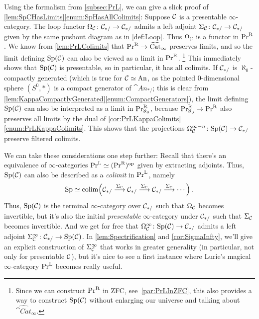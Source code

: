 \begin{rem}\label{rem:SpPresentable}
	Using the formalism from \cref{subsec:PrL}, we can give a slick proof of \cref{lem:SpCHasLimits}\cref{enum:SpHasAllColimits}: Suppose $\mathcal{C}$ is a presentable $\infty$-category. The loop functor $\Omega_{\mathcal{C}}\colon \mathcal{C}_{*/}\rightarrow \mathcal{C}_{*/}$ admits a left adjoint $\Sigma_{\mathcal{C}}\colon \mathcal{C}_{*/}\rightarrow \mathcal{C}_{*/}$ given by the same pushout diagram as in \cref{def:Loop}. Thus $\Omega_{\mathcal{C}}$ is a functor in $\mathrm{Pr}^{\mathrm{R}}$. We know from \cref{lem:PrLColimits} that $\mathrm{Pr}^{\mathrm{R}}\rightarrow \widehat{\mathrm{Cat}}_\infty$ preserves limits, and so the limit defining $\mathrm{Sp}(\mathcal{C})$ can also be viewed as a limit in $\mathrm{Pr}^{\mathrm{R}}$.%
	\footnote{Since we can construct $\mathrm{Pr}^{\mathrm{R}}$ in ZFC, see~\cref{par:PrLInZFC}, this also provides a way to construct $\mathrm{Sp}(\mathcal{C})$ without enlarging our universe and talking about $\widehat{\cat{Cat}}_\infty$.}
	This immediately shows that $\mathrm{Sp}(\mathcal{C})$ is presentable, so in particular, it has all colimits. If $\mathcal{C}_{*/}$ is $\aleph_0$-compactly generated (which is true for $\mathcal{C}\simeq \mathrm{An}$, as  the pointed $0$-dimensional sphere $(S^0,*)$ is a compact generator of $\cat{An}_{*/}$; this is clear from \cref{lem:KappaCompactlyGenerated}\cref{enum:CompactGenerators}), the limit defining $\mathrm{Sp}(\mathcal{C})$ can also be interpreted as a limit in $\mathrm{Pr}_{\aleph_0}^{\mathrm{R}}$, because $\mathrm{Pr}_{\aleph_0}^{\mathrm{R}}\rightarrow \mathrm{Pr}^{\mathrm{R}}$ also preserves all limits by the dual of \cref{cor:PrLKappaColimits}\cref{enum:PrLKappaColimits}. This shows that the projections $\Omega_{\mathcal{C}}^{\infty-n}\colon \mathrm{Sp}(\mathcal{C})\rightarrow \mathcal{C}_{*/}$ preserve filtered colimits.
	
	We can take these considerations one step further: Recall that there's an equivalence of $\infty$-categories $\mathrm{Pr}^{\mathrm{L}}\simeq (\mathrm{Pr}^{\mathrm{R}})^{\mathrm{op}}$ given by extracting adjoints. Thus, $\mathrm{Sp}(\mathcal{C})$ can also be described as a \emph{colimit} in $\mathrm{Pr}^{\mathrm{L}}$, namely
	\begin{equation*}
		 \cat{Sp}\simeq \colimit\left(\Cc_{*/}\overset{\Sigma_\Cc}{\longrightarrow}\Cc_{*/}\overset{\Sigma_\Cc}{\longrightarrow}\Cc_{*/}\overset{\Sigma_\Cc}{\longrightarrow}\dotsb\right)\,.
	\end{equation*}
	Thus, $\mathrm{Sp}(\mathcal{C})$ is the terminal $\infty$-category over $\mathcal{C}_{*/}$ such that $\Omega_{\mathcal{C}}$ becomes invertible, but it's also the initial \emph{presentable} $\infty$-category under $\mathcal{C}_{*/}$ such that $\Sigma_{\mathcal{C}}$ becomes invertible. And we get for free that $\Omega_{\mathcal{C}}^\infty\colon \mathrm{Sp}(\mathcal{C})\rightarrow \mathcal{C}_{*/}$ admits a left adjoint $\Sigma_{\mathcal{C}}^\infty\colon \mathcal{C}_{*/}\rightarrow \mathrm{Sp}(\mathcal{C})$. In \cref{lem:Spectrification} and \cref{cor:SigmaInfty}, we'll give an explicit construction of $\Sigma_{\mathcal{C}}^\infty$ that works in greater generality (in particular, not only for presentable $\mathcal{C}$), but it's nice to see a first instance where Lurie's magical $\infty$-category $\mathrm{Pr}^{\mathrm{L}}$ becomes really useful.
\end{rem}
